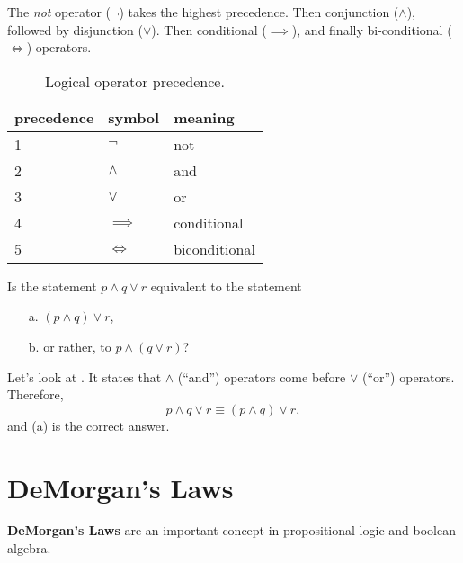 The \emph{not} operator ($\neg$) takes the highest precedence.
Then conjunction ($\land$), followed by disjunction ($\lor$).
Then conditional ($\implies$), and finally bi-conditional ($\iff$) operators.
\begin{table}[H]
  \centering
    \begin{tabular}{lll}
      \toprule
      precedence & symbol & meaning \\ \midrule
      1 & $\neg$      &not\\
      2 & $\land$     &and \\
      3 & $\lor$      & or \\
      4 & $\implies$  & conditional \\
      5 & $\iff$      &biconditional
      \\ \bottomrule
    \end{tabular}
  \caption{Logical operator precedence.}
  \label{tab:precedence}
\end{table}
\begin{ex}
    Is the statement $ p \land q \lor r $ equivalent to the statement
    \begin{enumerate}
        \item[a.] $(p \land q ) \lor r$,
        \item[b.] or rather, to $ p \land (q \lor r)$?
    \end{enumerate}
    \begin{sol}
        Let's look at .
        It states that $\land$ (``and'') operators come before $\lor$ (``or'') operators.
        Therefore,
        \[ p \land q \lor r \equiv (p \land q) \lor r,\]
        and (a) is the correct answer.
    \end{sol}
\end{ex}

\section{DeMorgan's Laws}
\textbf{DeMorgan's Laws} are an important concept in propositional logic and boolean algebra.

